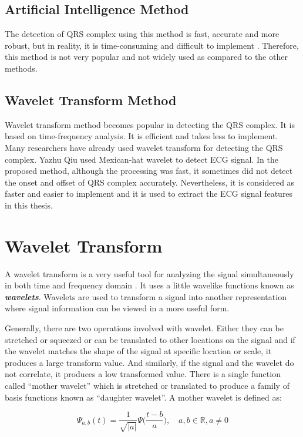 \subsection{Artificial Intelligence Method}
The detection of QRS complex using this method is fast, accurate and more robust, but in reality, it is time-consuming and difficult to implement \cite{126604}\cite{PIETKA1991139}\cite{58593}. Therefore, this method is not very popular and not widely used as compared to the other methods.

\subsection{Wavelet Transform Method}
Wavelet transform method becomes popular in detecting the QRS complex. It is based on time-frequency analysis. It is efficient and takes less to implement. Many researchers have already used wavelet transform for detecting the QRS complex. Yazhu Qiu \cite{PMID:17228741} used Mexican-hat wavelet to detect ECG signal. In the proposed method, although the processing was fast, it sometimes did not detect the onset and offset of QRS complex accurately. Nevertheless, it is considered as faster and easier to implement and it is used to extract the ECG signal features in this thesis.


\section{Wavelet Transform}

A wavelet transform is a very useful tool for analyzing the signal simultaneously in both time and frequency domain \cite{addison2017illustrated}. It uses a little wavelike functions known as \textbf{\textit{wavelets}}. Wavelets are used to transform a signal into another representation where signal information can be viewed in a more useful form.

Generally, there are two operations involved with wavelet. Either they can be stretched or squeezed or can be translated to other locations on the signal and if the wavelet matches the shape of the signal at specific location or scale, it produces a large transform value. And similarly, if the signal and the wavelet do not correlate, it produces a low transformed value. There is a single function called ``mother wavelet'' which is stretched or translated to produce a family of basis functions known as ``daughter wavelet''. A mother wavelet is defined as:

\begin{equation} \label{eqn_mother_wavelet}
{\Psi_{a,b}(t) = \frac{1}{\sqrt{|a|}}\Psi \bigg(\frac{t-b}{a}\bigg),\quad a, b \in \mathbb{R}, a \neq 0}
\end{equation}

